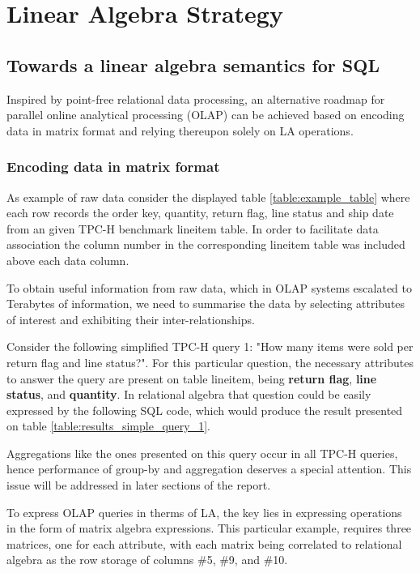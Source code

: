 \section{Linear Algebra Strategy}
\label{strategy}
\indent
\subsection{Towards a linear algebra semantics for SQL}

Inspired by point-free relational data processing, an alternative roadmap for parallel online analytical processing (OLAP) can be achieved based on encoding data in matrix format and relying thereupon solely on LA operations\cite{macedo2011middle}. 

\subsubsection{Encoding data in matrix format}

As example of raw data consider the displayed table \ref{table:example_table} where each row records the order key, quantity, return flag, line status and ship date from an given TPC-H benchmark lineitem table. In order to facilitate data association the column number in the corresponding lineitem table was included above each data column.


To obtain useful information from raw data, which in OLAP systems escalated to Terabytes of information, we need to summarise the data by selecting attributes of interest and exhibiting their inter-relationships.\par 
Consider the following simplified TPC-H query 1: "How many items were sold per return flag and line status?". For this particular question, the necessary attributes to answer the query are present on table lineitem, being \textbf{return flag}, \textbf{line status}, and \textbf{quantity}. In relational algebra that question could be easily expressed by the following SQL code, which would produce the result presented on table \ref{table:results_simple_query_1}.





Aggregations like the ones presented on this query occur in all TPC-H queries, hence performance of group-by and aggregation deserves a special attention.
This issue will be addressed in later sections of the report.\par 
To express OLAP queries in therms of LA, the key lies in expressing operations in the form of matrix algebra expressions. 
This particular example, requires three matrices, one for each attribute, with each matrix being correlated to relational algebra as the row storage of columns \#5, \#9, and \#10.

